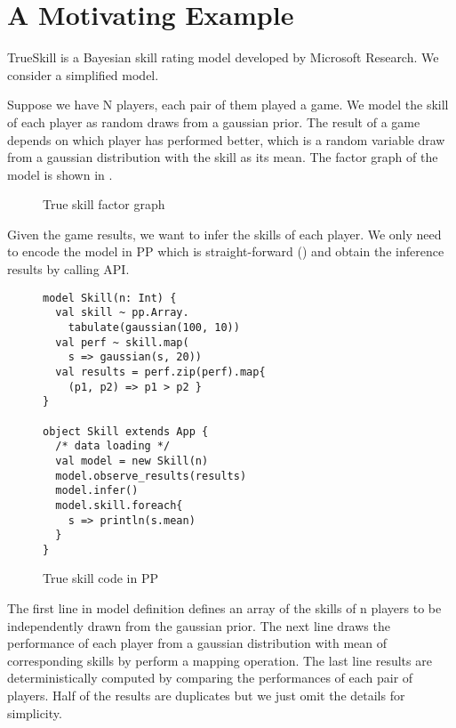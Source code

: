 \section{A Motivating Example}
\label{sec:motivate}

TrueSkill \cite{ralf2007trueskill} is a Bayesian skill rating model developed by Microsoft Research. We consider a simplified model.

Suppose we have N players, each pair of them played a game. We model the skill of each player as random draws from a gaussian prior. The result of a game depends on which player has performed better, which is a random variable draw from a gaussian distribution with the skill as its mean. The factor graph of the model is shown in .

\begin{figure}[h]
\centering
{}
\caption{True skill factor graph}
\label{fig:trueskill_factors}
\end{figure}

Given the game results, we want to infer the skills of each player. We only need
to encode the model in PP which is straight-forward () and
obtain the inference results by calling API.

\begin{figure}[h]
\centering
\begin{verbatim}
model Skill(n: Int) {
  val skill ~ pp.Array.
    tabulate(gaussian(100, 10))
  val perf ~ skill.map(
    s => gaussian(s, 20))
  val results = perf.zip(perf).map{ 
    (p1, p2) => p1 > p2 }
}

object Skill extends App {
  /* data loading */
  val model = new Skill(n)
  model.observe_results(results)
  model.infer()
  model.skill.foreach{
    s => println(s.mean)
  }
}
\end{verbatim}
\vspace{-15pt}
\caption{True skill code in PP}
\vspace{-5pt}
\label{fig:trueskill_code}
\end{figure}

The first line in model definition defines an array of the skills of n players to be independently drawn from the gaussian prior. The next line draws the performance of each player from a gaussian distribution with mean of corresponding skills by perform a mapping operation. The last line results are deterministically computed by comparing the performances of each pair of players. Half of the results are duplicates but we just omit the details for simplicity.

